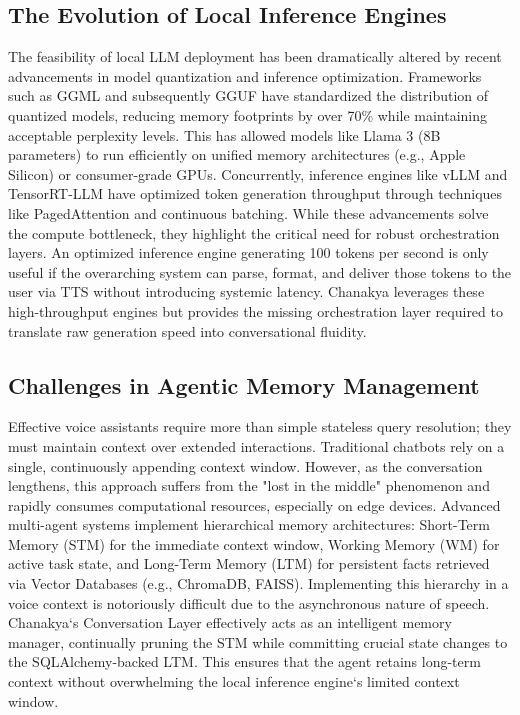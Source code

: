 \documentclass[conference]{IEEEtran}
\begin{document}
\subsection{The Evolution of Local Inference Engines}
The feasibility of local LLM deployment has been dramatically altered by recent advancements in model quantization and inference optimization. Frameworks such as GGML and subsequently GGUF have standardized the distribution of quantized models, reducing memory footprints by over 70\% while maintaining acceptable perplexity levels. This has allowed models like Llama 3 (8B parameters) to run efficiently on unified memory architectures (e.g., Apple Silicon) or consumer-grade GPUs. Concurrently, inference engines like vLLM and TensorRT-LLM have optimized token generation throughput through techniques like PagedAttention and continuous batching. While these advancements solve the compute bottleneck, they highlight the critical need for robust orchestration layers. An optimized inference engine generating 100 tokens per second is only useful if the overarching system can parse, format, and deliver those tokens to the user via TTS without introducing systemic latency. Chanakya leverages these high-throughput engines but provides the missing orchestration layer required to translate raw generation speed into conversational fluidity.

\subsection{Challenges in Agentic Memory Management}
Effective voice assistants require more than simple stateless query resolution; they must maintain context over extended interactions. Traditional chatbots rely on a single, continuously appending context window. However, as the conversation lengthens, this approach suffers from the "lost in the middle" phenomenon and rapidly consumes computational resources, especially on edge devices. Advanced multi-agent systems implement hierarchical memory architectures: Short-Term Memory (STM) for the immediate context window, Working Memory (WM) for active task state, and Long-Term Memory (LTM) for persistent facts retrieved via Vector Databases (e.g., ChromaDB, FAISS). Implementing this hierarchy in a voice context is notoriously difficult due to the asynchronous nature of speech. Chanakya`s Conversation Layer effectively acts as an intelligent memory manager, continually pruning the STM while committing crucial state changes to the SQLAlchemy-backed LTM. This ensures that the agent retains long-term context without overwhelming the local inference engine`s limited context window.
\end{document}
